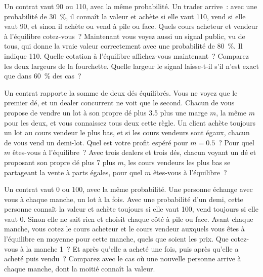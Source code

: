 \begin{question}\label{iq:iv2:making-a-market:27}
Un contrat vaut 90 ou 110, avec la même probabilité. Un trader arrive~: avec une probabilité de 30~\%, il connaît la valeur et achète si elle vaut 110, vend si elle vaut 90, et sinon il achète ou vend à pile ou face. Quels cours acheteur et vendeur à l'équilibre cotez-vous~? Maintenant vous voyez aussi un signal public, vu de tous, qui donne la vraie valeur correctement avec une probabilité de 80~\%. Il indique 110. Quelle cotation à l'équilibre affichez-vous maintenant~? Comparez les deux largeurs de la fourchette. Quelle largeur le signal laisse-t-il s'il n'est exact que dans 60~\% des cas~?
\end{question}

\begin{question}\label{iq:iv2:making-a-market:28}
Un contrat rapporte la somme de deux dés équilibrés. Vous ne voyez que le premier dé, et un dealer concurrent ne voit que le second. Chacun de vous propose de vendre un lot à son propre dé plus 3.5 plus une marge $m$, la même $m$ pour les deux, et vous connaissez tous deux cette règle. Un client achète toujours un lot au cours vendeur le plus bas, et si les cours vendeurs sont égaux, chacun de vous vend un demi-lot. Quel est votre profit espéré pour $m = 0.5$~? Pour quel $m$ êtes-vous à l'équilibre~? Avec trois dealers et trois dés, chacun voyant un dé et proposant son propre dé plus 7 plus $m$, les cours vendeurs les plus bas se partageant la vente à parts égales, pour quel $m$ êtes-vous à l'équilibre~?
\end{question}

\begin{question}\label{iq:iv2:making-a-market:29}
Un contrat vaut 0 ou 100, avec la même probabilité. Une personne échange avec vous à chaque manche, un lot à la fois. Avec une probabilité d'un demi, cette personne connaît la valeur et achète toujours si elle vaut 100, vend toujours si elle vaut 0. Sinon elle ne sait rien et choisit chaque côté à pile ou face. Avant chaque manche, vous cotez le cours acheteur et le cours vendeur auxquels vous êtes à l'équilibre en moyenne pour cette manche, quels que soient les prix. Que cotez-vous à la manche 1~? Et après qu'elle a acheté une fois, puis après qu'elle a acheté puis vendu~? Comparez avec le cas où une nouvelle personne arrive à chaque manche, dont la moitié connaît la valeur.
\end{question}

